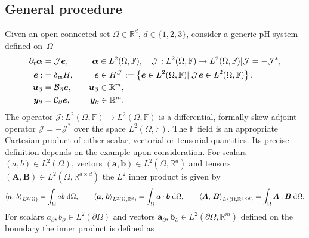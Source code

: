 \subsection{General procedure}\label{sec:pfem_gen}
Given an open connected set $\Omega \in \mathbb{R}^d,\, d \in  \{1,2,3\}$, consider a generic pH system defined on~$\Omega$
\begin{subequations}
\label{eq:pHsys_2}
\begin{align}
\partial_t {\bm{\alpha}} &= \mathcal{J}\displaystyle \bm{e}, \qquad \;\;\, \bm{\alpha} \in L^2(\Omega, \mathbb{F}), \quad \mathcal{J}: L^2(\Omega, \mathbb{F}) \rightarrow L^2(\Omega, \mathbb{F}) \vert \mathcal{J} = - \mathcal{J}^*, \label{eq:pHsys_dyn} \vspace{3pt}\\
\bm{e} :&= \displaystyle \delta_{\bm{\alpha}}H, \qquad \;\, \bm{e} \in H^\mathcal{J} :=\left\{\bm{e} \in L^2(\Omega, \mathbb{F}) \vert \; \mathcal{J}\bm{e} \in L^2(\Omega, \mathbb{F})  \right\}, \label{eq:pHsys_const} \\
\bm{u}_\partial &= \mathcal{B}_\partial  \displaystyle \bm{e}, \qquad \bm{u}_\partial \in \mathbb{R}^m, \label{eq:pHsys_u} \vspace{3pt}\\
\bm{y}_\partial &= \mathcal{C}_\partial \displaystyle \bm{e}, \qquad \; \bm{y}_\partial \in \mathbb{R}^m. \label{eq:pHsys_y} \vspace{3pt}
\end{align}
\end{subequations}
The operator $\mathcal{J}: L^2(\Omega, \mathbb{F}) \rightarrow L^2(\Omega, \mathbb{F})$ is a differential, formally skew adjoint operator $\mathcal{J} = - \mathcal{J}^*$ over the space $L^2(\Omega, \mathbb{F})$. The $\mathbb{F}$ field is an appropriate Cartesian product of either scalar, vectorial or tensorial quantities. Its precise definition depends on the example upon consideration. For scalars $(a,b) \in L^2(\Omega)$, vectors $(\bm{a}, \bm{b})\in L^2(\Omega, \mathbb{R}^d)$ and tensors  $(\bm{A}, \bm{B}) \in L^2(\Omega,\mathbb{R}^{d\times d})$ the $L^2$ inner product is given by 
\begin{equation}
\inner[L^2(\Omega)]{a}{b} = \int_{\Omega} a b \d\Omega, \qquad \inner[L^2(\Omega, \mathbb{R}^d)]{\bm{a}}{\bm{b}} = \int_{\Omega} \bm{a} \cdot \bm{b} \d\Omega, \qquad \inner[L^2(\Omega, \mathbb{R}^{d \times d})]{\bm{A}}{\bm{B}} = \int_{\Omega} \bm{A} \cddot \bm{B} \d\Omega.
\end{equation} 
For scalars ${a}_\partial, {b}_\partial \in L^2(\partial\Omega)$ and vectors  $\bm{a}_\partial, \bm{b}_\partial \in L^2(\partial\Omega, \mathbb{R}^m)$ defined on the boundary the inner product is defined as
